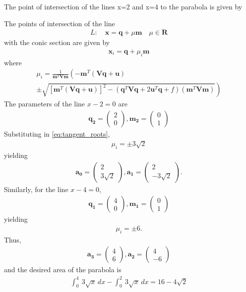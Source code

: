\documentclass[journal,10pt,twocolumn]{article}
\let\vec\mathbf
\newcommand{\myvec}[1]{\ensuremath{\begin{pmatrix}#1\end{pmatrix}}}
\providecommand{\brak}[1]{\ensuremath{\left(#1\right)}}
\providecommand{\lbrak}[1]{\ensuremath{\left(#1\right.}}
\providecommand{\rbrak}[1]{\ensuremath{\left.#1\right)}}
\providecommand{\sbrak}[1]{\ensuremath{{}\left[#1\right]}}
\begin{document}
{The point of intersection of the lines x=2 and x=4 to the parabola is given by



The points of intersection of the line 
\begin{align}
 L: \quad \vec{x} = \vec{q} + \mu \vec{m} \quad \mu \in \mathbf{R}
\label{eq:conic_tangent}
\end{align}
with the conic section are given by
\begin{align}
\vec{x}_i = \vec{q} + \mu_i \vec{m}
\label{eq:conic_tangent_pts}
\end{align}
%
where
{\tiny
\begin{multline}
\mu_i = \frac{1}
{
\vec{m}^T\vec{V}\vec{m}
}
\lbrak{-\vec{m}^T\brak{\vec{V}\vec{q}+\vec{u}}}
\\
\pm
\rbrak{\sqrt{
\sbrak{
\vec{m}^T\brak{\vec{V}\vec{q}+\vec{u}}
}^2
-
\brak
{
\vec{q}^T\vec{V}\vec{q} + 2\vec{u}^T\vec{q} +f
}
\brak{\vec{m}^T\vec{V}\vec{m}}
}
}
\label{eq:tangent_roots}
\end{multline}
}
\fi
The parameters of 
the line $x-2=0$ are
\begin{align}
\vec{q_2}=\myvec{2\\0},
\vec{m_2}=\myvec{0\\1}
\end{align}
Substituting in 
\eqref{eq:tangent_roots},
\begin{align}
\mu_i=\pm 3\sqrt{2}
\end{align}
yielding
\begin{align}
\vec{a_0}=\myvec{2\\3\sqrt{2}},
\vec{a_1}=\myvec{2\\-3\sqrt{2}}.
\end{align}
Similarly, 
for the line $x-4=0$,
\begin{align}
\vec{q_1}=\myvec{4\\0},
\vec{m_1}=\myvec{0\\1}
\end{align}
yielding
\begin{align}
\mu_i=\pm 6.
\end{align}
Thus, 
\begin{align}
\vec{a_3}=\myvec{4\\6},
\vec{a_2}=\myvec{4\\-6}
\end{align}
and the 
desired area of the parabola is
\begin{align}
\int_{0}^{4} \ 3\sqrt{x} \,dx-\int_{0}^{2} \ 3\sqrt{x} \,dx
=16-4\sqrt{2}
\end{align}
\iffalse


}
\end{document}
